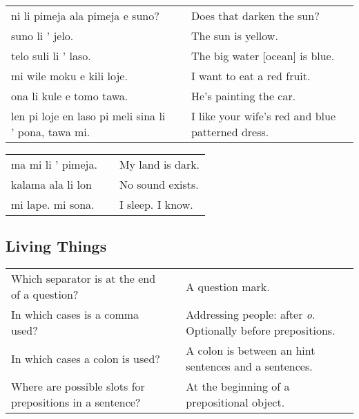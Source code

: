 \begin{supertabular}{p{5,5cm}|ll}
    ni li pimeja ala pimeja e suno?                      &  & Does that darken the sun?                        \\
    suno li ' jelo.                                      &  & The sun is yellow.                               \\
    telo suli li ' laso.                                 &  & The big water [ocean] is blue.                   \\
    mi wile moku e kili loje.                            &  & I want to eat a red fruit.                       \\
    ona li kule e tomo tawa.                             &  & He's painting the car.                           \\
    len pi loje en laso pi meli sina li ' pona, tawa mi. &  & I like your wife's red and blue patterned dress. \\
\end{supertabular}

\begin{supertabular}{p{5,5cm}|ll}
    ma mi li ' pimeja. &  & My land is dark. \\
    kalama ala li lon  &  & No sound exists. \\
    mi lape. mi sona.  &  & I sleep. I know. \\
\end{supertabular}

\newpage

\subsection*{Living Things}
\label{'living_things'}

\begin{supertabular}{p{5,5cm}|ll}
    Which separator is at the end of a question?             &  & A question mark.                                                     \\
    In which cases is a comma used?                          &  & Addressing people: after \textit{o}. Optionally before prepositions. \\
    In which cases a colon is used?                          &  & A colon is between an hint sentences and a sentences.                \\
    Where are possible slots for prepositions in a sentence? &  & At the beginning of a prepositional object.                          \\
\end{supertabular}

